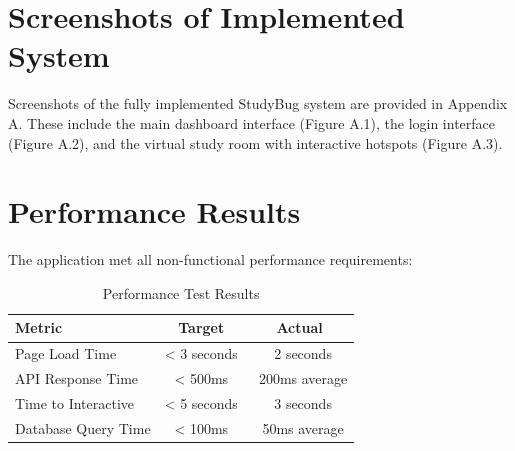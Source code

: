 \section{Screenshots of Implemented System}

Screenshots of the fully implemented StudyBug system are provided in Appendix A. These include the main dashboard interface (Figure A.1), the login interface (Figure A.2), and the virtual study room with interactive hotspots (Figure A.3).

\section{Performance Results}
The application met all non-functional performance requirements:

\begin{table}[H]
\centering
\begin{tabular}{|l|c|c|}
\hline
\textbf{Metric} & \textbf{Target} & \textbf{Actual} \\
\hline
Page Load Time & < 3 seconds & ~2 seconds \\
API Response Time & < 500ms & ~200ms average \\
Time to Interactive & < 5 seconds & ~3 seconds \\
Database Query Time & < 100ms & ~50ms average \\
\hline
\end{tabular}
\caption{Performance Test Results}
\end{table}
